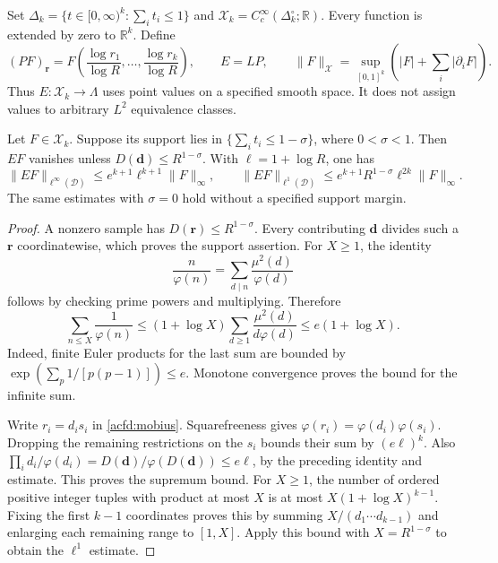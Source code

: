 Set $\Delta_k=\{t\in[0,\infty)^k:\sum_i t_i\leq1\}$ and
$\mathcal X_k=C_c^\infty(\Delta_k^\circ;\mathbb R)$.
Every function is extended by zero to $\mathbb R^k$.
Define
\[
 (PF)_{\boldsymbol r}
   =F\left(\frac{\log r_1}{\log R},\ldots,
           \frac{\log r_k}{\log R}\right),\qquad E=LP,
 \qquad
 \|F\|_{\mathcal X}
   =\sup_{[0,1]^k}\left(|F|+\sum_i|\partial_iF|\right).
\]
Thus $E:\mathcal X_k\to\Lambda$ uses point values on a specified smooth
space.  It does not assign values to arbitrary $L^2$ equivalence classes.

\begin{lemma}
Let\label{acfd:coefficients} $F\in\mathcal X_k$.  Suppose its support lies in
$\{\sum_i t_i\leq1-\sigma\}$, where $0<\sigma<1$.
Then $EF$ vanishes unless $D(\boldsymbol d)\leq R^{1-\sigma}$.
With $\ell=1+\log R$, one has
\[
 \|EF\|_{\ell^\infty(\mathcal D)}
       \leq e^{k+1}\ell^{k+1}\|F\|_\infty,
 \qquad
 \|EF\|_{\ell^1(\mathcal D)}
       \leq e^{k+1}R^{1-\sigma}\ell^{2k}\|F\|_\infty.
\]
The same estimates with $\sigma=0$ hold without a specified support margin.
\end{lemma}

\begin{proof}
A nonzero sample has $D(\boldsymbol r)\leq R^{1-\sigma}$.
Every contributing $\boldsymbol d$ divides such a $\boldsymbol r$
coordinatewise, which proves the support assertion.
For $X\geq1$, the identity
\[
 \frac n{\varphi(n)}=\sum_{d\mid n}\frac{\mu^2(d)}{\varphi(d)}
\]
follows by checking prime powers and multiplying.  Therefore
\begin{equation}\label{acfd:totient-sum}
 \sum_{n\leq X}\frac1{\varphi(n)}
 \leq(1+\log X)\sum_{d\geq1}\frac{\mu^2(d)}{d\varphi(d)}
 \leq e(1+\log X).
\end{equation}
Indeed, finite Euler products for the last sum are bounded by
$\exp(\sum_{p}1/[p(p-1)])\leq e$.
Monotone convergence proves the bound for the infinite sum.

Write $r_i=d_is_i$ in \eqref{acfd:mobius}.
Squarefreeness gives $\varphi(r_i)=\varphi(d_i)\varphi(s_i)$.
Dropping the remaining restrictions on the $s_i$ bounds their sum by
$(e\ell)^k$.
Also $\prod_i d_i/\varphi(d_i)=D(\boldsymbol d)/\varphi(D(\boldsymbol d))
\leq e\ell$, by the preceding identity and estimate.
This proves the supremum bound.
For $X\geq1$, the number of ordered positive integer tuples with product
at most $X$ is at most $X(1+\log X)^{k-1}$.
Fixing the first $k-1$ coordinates proves this by summing
$X/(d_1\cdots d_{k-1})$ and enlarging each remaining range to $[1,X]$.
Apply this bound with $X=R^{1-\sigma}$ to obtain the $\ell^1$ estimate.
\end{proof}

